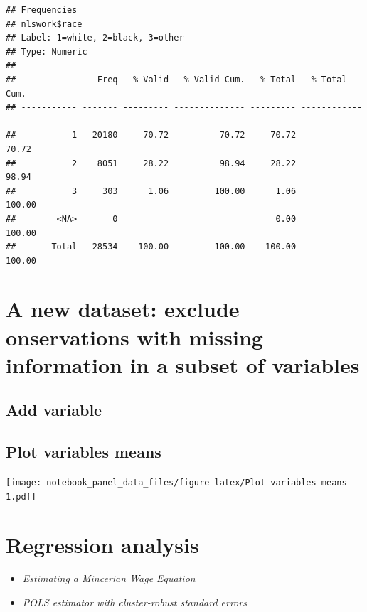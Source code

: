 \documentclass[
]{article}
\begin{document}
\begin{verbatim}
## Frequencies  
## nlswork$race  
## Label: 1=white, 2=black, 3=other  
## Type: Numeric  
## 
##                Freq   % Valid   % Valid Cum.   % Total   % Total Cum.
## ----------- ------- --------- -------------- --------- --------------
##           1   20180     70.72          70.72     70.72          70.72
##           2    8051     28.22          98.94     28.22          98.94
##           3     303      1.06         100.00      1.06         100.00
##        <NA>       0                               0.00         100.00
##       Total   28534    100.00         100.00    100.00         100.00
\end{verbatim}

\hypertarget{a-new-dataset-exclude-onservations-with-missing-information-in-a-subset-of-variables}{%
\section{A new dataset: exclude onservations with missing information in
a subset of
variables}\label{a-new-dataset-exclude-onservations-with-missing-information-in-a-subset-of-variables}}

\hypertarget{add-variable}{%
\subsection{Add variable}\label{add-variable}}

\hypertarget{plot-variables-means}{%
\subsection{Plot variables means}\label{plot-variables-means}}

\texttt{[image: notebook\_panel\_data\_files/figure-latex/Plot variables means-1.pdf]}

\hypertarget{regression-analysis}{%
\section{Regression analysis}\label{regression-analysis}}

\begin{itemize}
\item
  \emph{Estimating a Mincerian Wage Equation}
\item
  \emph{POLS estimator with cluster-robust standard errors}
\end{itemize}
\end{document}
